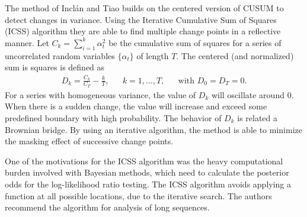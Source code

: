 The method of Incl\'{a}n and Tiao \cite{inclan1994use} builds on the centered version of CUSUM \cite{brown1975techniques} to detect changes in variance.
Using the Iterative Cumulative Sum of Squares (ICSS) algorithm they are able to find multiple change points in a reflective manner.
Let $C_k = \sum_{i=1}^k \alpha_t^2$ be the cumulative sum of squares for a series of uncorrelated random variables $\{\alpha_t\}$ of length $T$.
The centered (and normalized) sum is squares is defined as
\begin{equation}
  \begin{aligned}
  D_k = \frac{C_k}{C_T} - \frac{k}{T}, & & k = 1, \dots, T, & & \text{with } D_0 = D_T = 0.
  \end{aligned}
\end{equation}
For a series with homogeneous variance, the value of $D_k$ will oscillate around $0$.
When there is a sudden change, the value will increase and exceed some predefined boundary with high probability.
The behavior of $D_k$ is related a Brownian bridge.
By using an iterative algorithm, the method is able to minimize the masking effect of successive change points.

One of the motivations for the ICSS algorithm was the heavy computational burden involved with Bayesian methods, which need to calculate the posterior odds for the log-likelihood ratio testing.
The ICSS algorithm avoids applying a function at all possible locations, due to the iterative search.
The authors recommend the algorithm for analysis of long sequences.